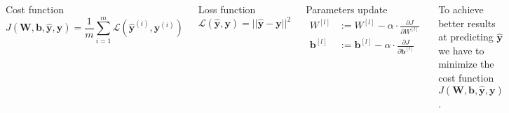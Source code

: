 \begin{frame}
    \begin{columns}
        \begin{block}{Cost function}
            $$
            J(\bm{W}, \bm{b}, \hat{\bm{y}}, \bm{y}) = 
            \frac{1}{m} \sum_{i=1}^{m} \mathcal{L}(\hat{\bm{y}}^{(i)}, \bm{y}^{(i)})
            $$
        \end{block}
        \begin{block}{Loss function}
            $$
            \mathcal{L}(\hat{\bm{y}}, \bm{y}) = ||\hat{\bm{y}} - \bm{y}||^2
            $$
        \end{block}
        \begin{block}{Parameters update}
            \begin{align*}
            W^{[l]} &:= W^{[l]} - \alpha \cdot \frac{\partial J}{\partial W^{[l]}} \\
            \bm{b}^{[l]} &:= \bm{b}^{[l]} - \alpha \cdot \frac{\partial J}{\partial \bm{b}^{[l]}}
            \end{align*}
        \end{block}
        To achieve better results at predicting $\hat{\bm{y}}$ 
        we have to minimize the cost function $J(\bm{W}, \bm{b}, \hat{\bm{y}}, \bm{y})$.
    \end{columns}
\end{frame}

